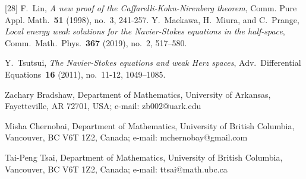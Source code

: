 \documentclass[11pt]{article}
\numberwithin{equation}{section}
\theoremstyle{remark}
\theoremstyle{definition}
\begin{document}
\begin{thebibliography}{[28]}
F.~Lin, \emph{A new proof of the {C}affarelli-{K}ohn-{N}irenberg theorem},
  Comm. Pure Appl. Math.~\textbf{51} (1998), no.~3, 241-257.
%
%
%
%
%
%
%
Y.~Maekawa, H.~Miura, and C.~Prange,
  \emph{Local energy weak solutions for the {N}avier-{S}tokes equations in the half-space},
  Comm.\ Math.\ Phys.~\textbf{367} (2019), no.~2, 517--580.
%
%

%

%
%
%
%

%
%
%
%
%
%
%
%
%
%
%
%


%
%
%
%
%
%
%


%
%
%
%
%




%
%
%
%
%
%


  Y.~Tsutsui,
  \emph{The {N}avier-{S}tokes equations and weak {H}erz spaces},
  Adv.\ Differential Equations~\textbf{16} (2011), no.~11-12, 1049--1085.
\end{thebibliography}


\medskip
Zachary Bradshaw, Department of Mathematics, University of Arkansas, Fayetteville, AR 72701, USA;
e-mail: zb002@uark.edu
\medskip

Misha Chernobai, Department of Mathematics, University of British Columbia, Vancouver, BC V6T 1Z2, Canada;
 e-mail: mchernobay@gmail.com

\medskip

Tai-Peng Tsai, Department of Mathematics, University of British Columbia,
Vancouver, BC V6T 1Z2, Canada; e-mail: ttsai@math.ubc.ca
\end{document}
